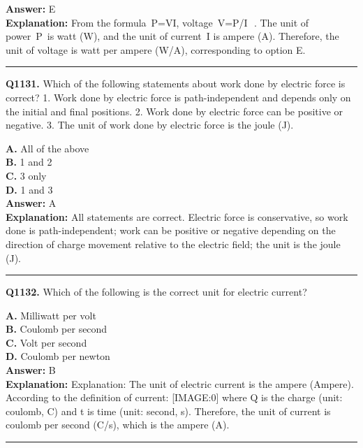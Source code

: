 \documentclass[12pt]{article}
\begin{document}
\textbf{Answer:} E \\
\textbf{Explanation:} From the formula P=VI, voltage V=P/I
​
. The unit of power P is watt (W), and the unit of current I is ampere (A). Therefore, the unit of voltage is watt per ampere (W/A), corresponding to option E.

\hrule
\vspace{1em}


\noindent
\textbf{Q1131.} Which of the following statements about work done by electric force is correct?
1.
Work done by electric force is path-independent and depends only on the initial and final positions.
2.
Work done by electric force can be positive or negative.
3.
The unit of work done by electric force is the joule (J).



\textbf{A.} All of the above \\
\textbf{B.} 1 and 2 \\
\textbf{C.} 3 only \\
\textbf{D.} 1 and 3 \\

\textbf{Answer:} A \\
\textbf{Explanation:} All statements are correct. Electric force is conservative, so work done is path-independent; work can be positive or negative depending on the direction of charge movement relative to the electric field; the unit is the joule (J).

\hrule
\vspace{1em}


\noindent
\textbf{Q1132.} Which of the following is the correct unit for electric current?



\textbf{A.} Milliwatt per volt \\
\textbf{B.} Coulomb per second \\
\textbf{C.} Volt per second \\
\textbf{D.} Coulomb per newton \\

\textbf{Answer:} B \\
\textbf{Explanation:} Explanation: The unit of electric current is the ampere (Ampere). According to the definition of current:
[IMAGE:0]
where Q is the charge (unit: coulomb, C) and t is time (unit: second, s). Therefore, the unit of current is coulomb per second (C/s), which is the ampere (A).

\hrule
\vspace{1em}
\end{document}
